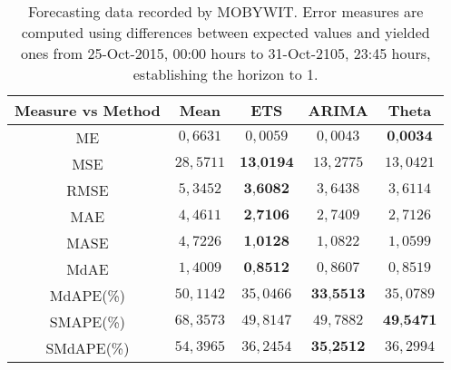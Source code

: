 \begin{table}
{\scriptsize
\centering
\begin{tabular}{|c|c|c|c|c|}
\hline
Measure vs Method &Mean &ETS &ARIMA &Theta\\
\hline
ME &$0,6631$ & $0,0059$ & $0,0043$ & $\textbf{0,0034}$\\
MSE &$28,5711$ & $\textbf{13,0194}$ & $13,2775$ & $13,0421$\\
RMSE &$5,3452$ & $\textbf{3,6082}$ & $3,6438$ & $3,6114$\\
MAE &$4,4611$ & $\textbf{2,7106}$ & $2,7409$ & $2,7126$\\
MASE &$4,7226$ & $\textbf{1,0128}$ & $1,0822$ & $1,0599$\\
MdAE &$1,4009$ & $\textbf{0,8512}$ & $0,8607$ & $0,8519$\\
MdAPE(\%) &$50,1142$ & $35,0466$ & $\textbf{33,5513}$ & $35,0789$\\
 SMAPE(\%) &$68,3573$ & $49,8147$ & $49,7882$ & $\textbf{49,5471}$\\
 SMdAPE(\%) &$54,3965$ & $36,2454$ & $\textbf{35,2512}$ & $36,2994$\\
\hline
\end{tabular}
}
\caption{Forecasting data recorded by MOBYWIT. Error measures are computed using differences between expected values and yielded ones from 25-Oct-2015, 00:00 hours to 31-Oct-2105, 23:45 hours, establishing the horizon to 1.}
\label{tab:forecasting}
\end{table}

